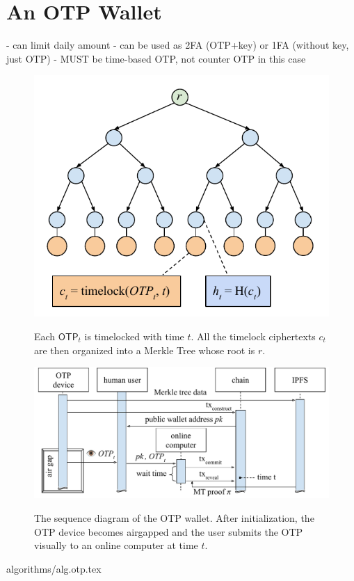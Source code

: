 \section{An OTP Wallet}

- can limit daily amount
- can be used as 2FA (OTP+key) or 1FA (without key, just OTP)
- MUST be time-based OTP, not counter OTP in this case

\begin{figure}[ht]
    \caption{Each $\textsf{OTP}_t$ is timelocked with time $t$. All the timelock
             ciphertexts $c_t$ are
             then organized into a Merkle Tree whose root is $r$.}
    \centering
    \includegraphics[width=\columnwidth,keepaspectratio]{figures/timelock-merkle.pdf}
    \label{fig.merkle-otp}
\end{figure}

\begin{figure}[ht]
    \caption{The sequence diagram of the OTP wallet. After initialization, the OTP device
             becomes airgapped and the user submits the OTP visually to an online computer
             at time $t$.}
    \centering
    \includegraphics[width=0.7 \textwidth,keepaspectratio]{figures/otp-sequence-diagram.pdf}
    \label{fig.sequence-diagram}
\end{figure}

{algorithms/alg.otp.tex}
